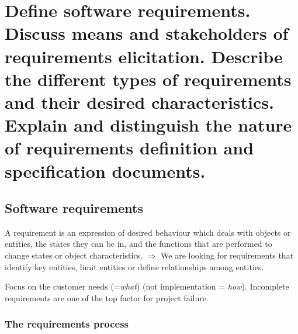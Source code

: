 \clearpage{}

\section{Define software requirements. Discuss means and stakeholders of
requirements elicitation. Describe the different types of requirements and
their desired characteristics. Explain and distinguish the nature of
requirements definition and specification documents.}

\subsection{Software requirements}



A requirement is an expression of desired behaviour which deals with objects or
entities, the states they can be in, and the functions that are performed to change states or
object characteristics. 
$\Rightarrow$ We are looking for requirements that identify key entities, limit
entities or define relationships among entities.
\newline

Focus on the customer needs (=\textit{what}) (not implementation =
\textit{how}). Incomplete requirements are one of the top
factor for project failure.

\subsubsection{The requirements process}

